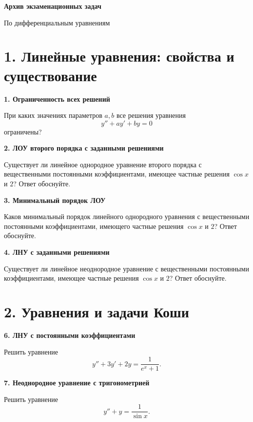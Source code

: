 \documentclass[11pt,a4paper]{article}
\newcommand{\sect}[1]{\Needspace{85mm}\section*{\color{accent}#1}}
\newcommand{\task}[2]{\par\vspace{6pt}
 {\bfseries\color{accent}#1. #2}\par}
\begin{document}
{\huge\bfseries\color{accent}Архив экзаменационных задач}\par
{\large По дифференциальным уравнениям}\par
\vspace{4pt}

\sect{1. Линейные уравнения: свойства и существование}

\begin{minipage}[t]{\linewidth}
\task{1}{Ограниченность всех решений}
При каких значениях параметров $a,b$ все решения уравнения
\[
 y''+ay'+by=0
\]
ограничены?
\end{minipage}\par\vspace{6pt}

\begin{minipage}[t]{\linewidth}
\task{2}{ЛОУ второго порядка с заданными решениями}
Существует ли линейное однородное уравнение второго порядка с вещественными
постоянными коэффициентами, имеющее частные решения $\cos x$ и $2$?
Ответ обоснуйте.
\end{minipage}\par\vspace{6pt}

\begin{minipage}[t]{\linewidth}
\task{3}{Минимальный порядок ЛОУ}
Каков минимальный порядок линейного однородного уравнения с вещественными
постоянными коэффициентами, имеющего частные решения $\cos x$ и $2$?
Ответ обоснуйте.
\end{minipage}\par\vspace{6pt}

\begin{minipage}[t]{\linewidth}
\task{4}{ЛНУ с заданными решениями}
Существует ли линейное неоднородное уравнение с вещественными постоянными
коэффициентами, имеющее частные решения $\cos x$ и $2$? Ответ обоснуйте.
\end{minipage}\par\vspace{6pt}

\sect{2. Уравнения и задачи Коши}

\begin{minipage}[t]{\linewidth}
\task{6}{ЛНУ с постоянными коэффициентами}
Решить уравнение
\[
 y''+3y'+2y=\frac{1}{e^x+1}.
\]
\end{minipage}\par\vspace{6pt}

\begin{minipage}[t]{\linewidth}
\task{7}{Неоднородное уравнение с тригонометрией}
Решить уравнение
\[
 y''+y=\frac{1}{\sin x}.
\]
\end{minipage}\par\vspace{6pt}
\end{document}
